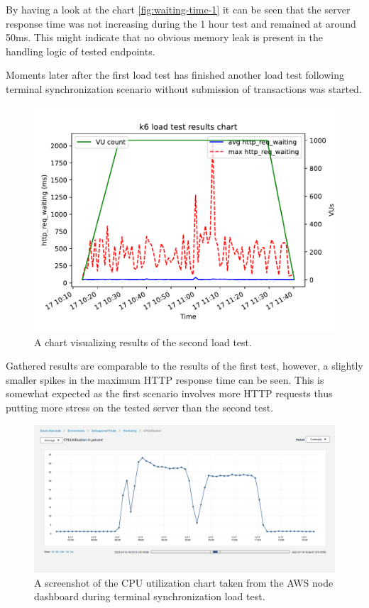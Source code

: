\documentclass[12pt, a4paper]{article}
\begin{document}
By having a look at the chart \ref{fig:waiting-time-1} it can be seen that the server response time was not increasing during the 1 hour test and remained at around 50ms.
This might indicate that no obvious memory leak is present in the handling logic of tested endpoints.

Moments later after the first load test has finished another load test following terminal synchronization scenario without submission of transactions was started.

\begin{figure}[!ht]
    \centering 
    \includegraphics[width=1\textwidth]{pdf/avg-waiting-time-2.pdf}
    \caption{A chart visualizing results of the second load test.}
    \label{fig:waiting-time-2}
\end{figure}

Gathered results are comparable to the results of the first test, however, a slightly smaller spikes in the maximum HTTP response time can be seen.
This is somewhat expected as the first scenario involves more HTTP requests thus putting more stress on the tested server than the second test.

\begin{figure}[!ht]
    \centering 
    \includegraphics[width=1\textwidth]{img/node-cpu-usage.png}
    \caption{A screenshot of the CPU utilization chart taken from the AWS node dashboard during terminal synchronization load test.}
    \label{fig:cpu-usage-1}
\end{figure}
\end{document}

